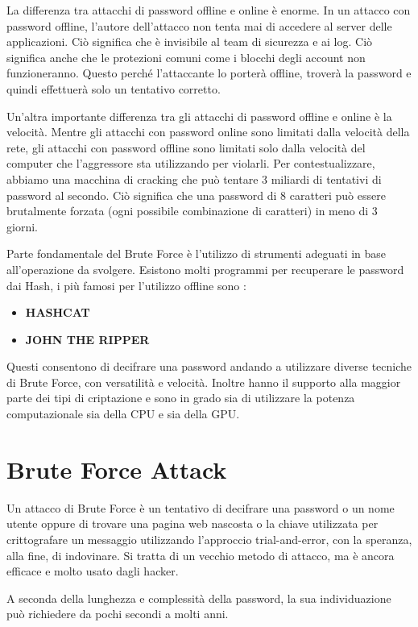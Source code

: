 La differenza tra attacchi di password offline e online è enorme. In un attacco con password offline, l'autore dell'attacco non tenta mai di accedere al server delle applicazioni. Ciò significa che è invisibile al team di sicurezza e ai log. Ciò significa anche che le protezioni comuni come i blocchi degli account non funzioneranno. Questo perché l'attaccante lo porterà offline, troverà la password e quindi effettuerà solo un tentativo corretto.

Un'altra importante differenza tra gli attacchi di password offline e online è la velocità. Mentre gli attacchi con password online sono limitati dalla velocità della rete, gli attacchi con password offline sono limitati solo dalla velocità del computer che l'aggressore sta utilizzando per violarli. Per contestualizzare, abbiamo una macchina di cracking che può tentare 3 miliardi di tentativi di password al secondo. Ciò significa che una password di 8 caratteri può essere brutalmente forzata (ogni possibile combinazione di caratteri) in meno di 3 giorni.

Parte fondamentale del Brute Force è l'utilizzo di strumenti adeguati in base all'operazione da svolgere.
Esistono molti programmi per recuperare le password dai Hash, i più famosi per l'utilizzo offline sono :
\begin{itemize}
    \item \textbf{HASHCAT}\cite{hashcat}
    \item \textbf{JOHN THE RIPPER}\cite{John_The_Ripper}
\end{itemize}
Questi consentono di decifrare una password andando a utilizzare diverse tecniche di Brute Force, con versatilità e velocità.
Inoltre hanno il supporto alla maggior parte dei tipi di criptazione e sono in grado sia di utilizzare la potenza computazionale sia della CPU e sia della GPU.

\section{Brute Force Attack}
Un attacco di Brute Force \cite{Brute_attack}\cite{Brute_attack2} è un tentativo di decifrare una password o un nome utente oppure di trovare una pagina web nascosta o la chiave utilizzata per crittografare un messaggio utilizzando l'approccio  trial-and-error, con la speranza, alla fine, di indovinare. Si tratta di un vecchio metodo di attacco, ma è ancora efficace e molto usato dagli hacker.

A seconda della lunghezza e complessità della password, la sua individuazione può richiedere da pochi secondi a molti anni.

